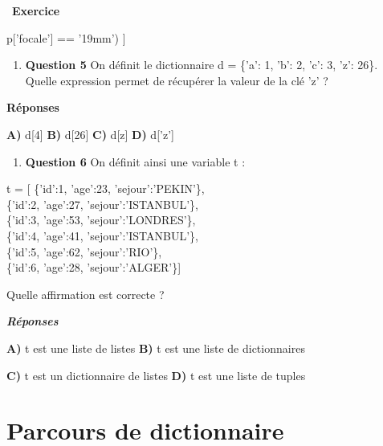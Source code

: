 \documentclass[
  11pt,
]{article}
\providecommand{\tightlist}{%
  \setlength{\itemsep}{0pt}\setlength{\parskip}{0pt}}
\newcounter{exo}
\newenvironment{exercice}[1]
{\par \medskip   \addtocounter{exo}{1} \noindent  
\begin{bclogo}[arrondi =0.1,   noborder = true, logo=\bccrayon, marge=4]{~\textbf{Exercice} \textbf{\theexo} {\itshape #1} }  \par}
{
\end{bclogo}
 \par \bigskip }
\newcounter{def}
\newcounter{cours}
\begin{document}
\begin{exercice}{}
p{[}'focale'{]} == '19mm') {]}

\begin{enumerate}
\def\labelenumi{\arabic{enumi}.}
\setcounter{enumi}{4}
\tightlist
\item
  \textbf{Question 5} On définit le dictionnaire d = \{'a': 1, 'b': 2,
  'c': 3, 'z': 26\}. Quelle expression permet de récupérer la valeur de
  la clé 'z' ?
\end{enumerate}

\textbf{Réponses}

\textbf{A)} d{[}4{]} \textbf{B)} d{[}26{]} \textbf{C)} d{[}z{]}
\textbf{D)} d{[}'z'{]}

\begin{enumerate}
\def\labelenumi{\arabic{enumi}.}
\setcounter{enumi}{5}
\tightlist
\item
  \textbf{Question 6} On définit ainsi une variable t :
\end{enumerate}

t = {[} \{'id':1, 'age':23, 'sejour':'PEKIN'\},\\
\{'id':2, 'age':27, 'sejour':'ISTANBUL'\},\\
\{'id':3, 'age':53, 'sejour':'LONDRES'\},\\
\{'id':4, 'age':41, 'sejour':'ISTANBUL'\},\\
\{'id':5, 'age':62, 'sejour':'RIO'\},\\
\{'id':6, 'age':28, 'sejour':'ALGER'\}{]}

Quelle affirmation est correcte ?

\textbf{\emph{Réponses}}

\textbf{A)} t est une liste de listes \textbf{B)} t est une liste de
dictionnaires

\textbf{C)} t est un dictionnaire de listes \textbf{D)} t est une liste
de tuples

\end{exercice}

\hypertarget{parcours-de-dictionnaire}{%
\section{Parcours de dictionnaire}\label{parcours-de-dictionnaire}}
\end{document}
